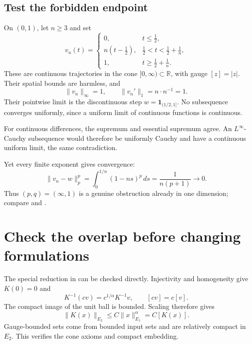 \documentclass[12pt,reqno]{amsart}
\begin{document}
\subsection{Test the forbidden endpoint}

On $(0,1)$, let $n\ge3$ and set
\[
v_n(t)=\begin{cases}
0,&t\le\tfrac12,\\
n(t-\tfrac12),&\tfrac12<t<\tfrac12+\tfrac1n,\\
1,&t\ge\tfrac12+\tfrac1n.
\end{cases}
\]
These are continuous trajectories in the cone $[0,\infty)\subset\mathbb R$, with gauge $[z]=|z|$. Their spatial bounds are harmless, and
\[
\|v_n\|_\infty=1,\qquad \|v_n'\|_1=n\cdot n^{-1}=1.
\]
Their pointwise limit is the discontinuous step $w=\mathbf1_{(1/2,1]}$. No subsequence converges uniformly, since a uniform limit of continuous functions is continuous.

For continuous differences, the supremum and essential supremum agree. An $L^\infty$-Cauchy subsequence would therefore be uniformly Cauchy and have a continuous uniform limit, the same contradiction.

Yet every finite exponent gives convergence:
\begin{equation}\label{eq:ramp}
\|v_n-w\|_p^p=\int_0^{1/n}(1-ns)^p\,ds
=\frac1{n(p+1)}\longrightarrow0.
\end{equation}
Thus $(p,q)=(\infty,1)$ is a genuine obstruction already in one dimension; compare \cite[Proposition 3, p.~94]{S-simon} and \cite[Remark 2, p.~4]{S-barrett-suli}.

\section{Check the overlap before changing formulations}

\begin{proposition}\label{prop:overlap}

\end{proposition}

The special reduction in \cite[Section 4, pp.~15--16]{S-barrett-suli} can be checked directly. Injectivity and homogeneity give $K(0)=0$ and
\[
K^{-1}(cv)=c^{1/\alpha}K^{-1}v,\qquad [cv]=c[v].
\]
The compact image of the unit ball is bounded. Scaling therefore gives
\[
\|K(x)\|_{E_2}\le C\|x\|_{E_1}^{\alpha}=C[K(x)].
\]
Gauge-bounded sets come from bounded input sets and are relatively compact in $E_2$. This verifies the cone axioms and compact embedding.
\end{document}
